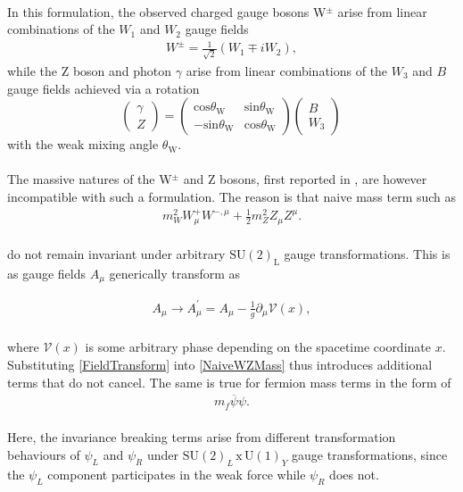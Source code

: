 \\
In this formulation, the observed charged gauge bosons W$^{\pm}$ arise from linear combinations of the $W_1$ and $W_2$ gauge fields
\begin{align}
    W^{\pm} = \frac{1}{\sqrt{2}}(W_1 \mp iW_2) , 
\end{align}
while the Z boson and photon $\gamma$ arise from linear combinations of the $W_3$ and $B$ gauge fields achieved via a rotation
\begin{equation}
    \begin{pmatrix}
    \gamma \\
    Z
    \end{pmatrix} = 
    \begin{pmatrix}
    \mathrm{cos}\theta_{\mathrm{W}} & \mathrm{sin}\theta_{\mathrm{W}} \\
    \mathrm{-sin}\theta_{\mathrm{W}} & \mathrm{cos}\theta_{\mathrm{W}}
    \end{pmatrix}
    \begin{pmatrix}
    B \\
    W_3
    \end{pmatrix} \,
\end{equation}
with the weak mixing angle $\theta_{\mathrm{W}}$. \\
\\
The massive natures of the W$^{\pm}$ and Z bosons, first reported in \cite{WZMass}, are however incompatible with such a formulation. The reason is that naive mass term such as 
\begin{align}
    m_W^{2}W_{\mu}^{+}W^{-, \mu}+\frac{1}{2}m_Z^{2}Z_{\mu}Z^{\mu}. \label{NaiveWZMass}
\end{align}
\\
do not remain invariant under arbitrary $\mathrm{SU(2)_L}$ gauge transformations. This is as gauge fields $A_{\mu}$ generically transform as 

\begin{align}
    A_{\mu} \rightarrow A_{\mu}^{'} =  A_{\mu} - \frac{1}{g} \partial_{\mu} \mathcal{V}(x), \label{FieldTransform}
\end{align}
\\
where $\mathcal{V}(x)$ is some arbitrary phase depending on the spacetime coordinate $x$. Substituting \autoref{FieldTransform} into \autoref{NaiveWZMass} thus introduces additional terms that do not cancel. The same is true for fermion mass terms in the form of
\begin{align}
    m_{f}\overline{\psi}\psi. \label{NaiveFermionMass}
\end{align} 
\\
Here, the invariance breaking terms arise from different transformation behaviours of $\psi_{L}$ and $\psi_{R}$ under $\mathrm{SU}(2)_L \, \mathrm{x} \, \mathrm{U}(1)_{Y}$ gauge transformations, since the $\psi_{L}$ component participates in the weak force while $\psi_{R}$ does not. 
